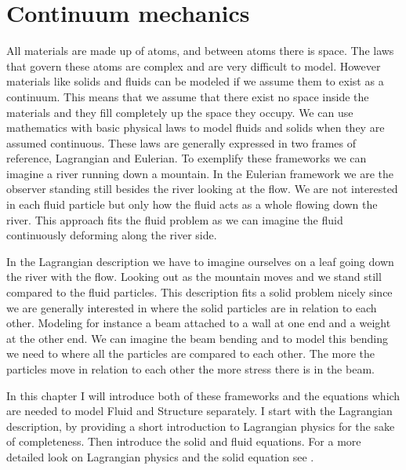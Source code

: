 \chapter{Continuum mechanics}
All materials are made up of atoms, and between atoms there is space. The laws that govern these atoms are complex and are very difficult to model. However materials like solids and fluids can be modeled if we assume them to exist as a continuum. This means that we assume that there exist no space inside the materials and they fill completely up the space they occupy. 
We can use mathematics with basic physical laws to model fluids and solids when they are assumed continuous. These laws are generally expressed in two frames of reference, Lagrangian and Eulerian. To exemplify these frameworks we can imagine a river running down a mountain. In the Eulerian framework we are the observer standing still besides the river looking at the flow. We are not interested in each fluid particle but only how the fluid acts as a whole flowing down the river. This approach fits the fluid problem as we can imagine the fluid continuously deforming along the river side. \newline

In the Lagrangian description we have to imagine ourselves on a leaf going down the river with the flow. Looking out as the mountain moves and we stand still compared to the fluid particles. This description fits a solid problem nicely since we are generally interested in where the solid particles are in relation to each other. Modeling for instance a beam attached to a wall at one end and a weight at the other end. We can imagine the beam bending and to model this bending we need to where all the particles are compared to each other. The more the particles move in relation to each other the more stress there is in the beam. \newline 

In this chapter I will introduce both of these frameworks and the equations which are needed to model Fluid and Structure separately. I start with the Lagrangian description, by providing a short introduction to Lagrangian physics for the sake of completeness. Then introduce the solid and fluid equations. For a more detailed look on Lagrangian physics and the solid equation see \cite{Holzapfel2000}.





\begin{comment}
Let $\Omega \in \mathbb{R}^d $ for $d \in \{1,2\}$, be a bounded domain with boundary $ \partial \Omega$. The domain is made up of of two sub domains $ \mathcal{F} $ for the fluid domain, and $\mathcal{S}$ for the solid. The interface between the domains are denoted by $ \Sigma = \mathcal{F} \cap \mathcal{S} $. The reference or initial is denoted by $ \hat{\Sigma} = \hat{\mathcal{F}} \cap \hat{\mathcal{S}}  $ 
\end{comment}

